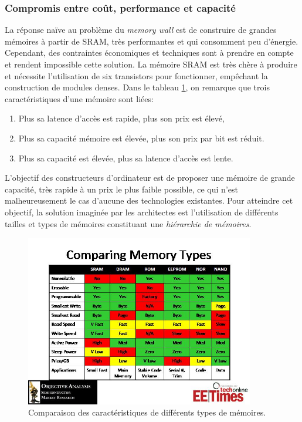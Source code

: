     \subsubsection{Compromis entre coût, performance et capacité } 
        
        La réponse naïve au problème du \textit{memory wall} est de construire de grandes mémoires à partir de SRAM, très performantes et qui consomment peu d'énergie. Cependant, des contraintes économiques et techniques sont à prendre en compte et rendent impossible cette solution. La mémoire SRAM est très chère à produire et nécessite l'utilisation de six transistors pour fonctionner, empêchant la construction de modules denses. Dans le tableau \ref{pic_cpu_memory_comparison}, on remarque que trois caractéristiques d'une mémoire sont liées:
        \begin{enumerate}
            \item Plus sa latence d'accès est rapide, plus son prix est élevé,
            \item Plus sa capacité mémoire est élevée, plus son prix par bit est réduit.
            \item Plus sa capacité est élevée, plus sa latence d'accès est lente.
        \end{enumerate}
        L'objectif des constructeurs d'ordinateur est de proposer une mémoire de grande capacité, très rapide à un prix le plus faible possible, ce qui n'est malheureusement le cas d'aucune des technologies existantes. Pour atteindre cet objectif, la solution imaginée par les architectes est l'utilisation de différents tailles et types de mémoires constituant une \textit{hiérarchie de mémoires}.
        
        
        \begin{figure}
            \center
            \includegraphics[width=10cm]{images/cpu_memory_comparison.jpg}
            \caption{\label{pic_cpu_memory_comparison} Comparaison des caractéristiques de différents types de mémoires.}
        \end{figure}
        
